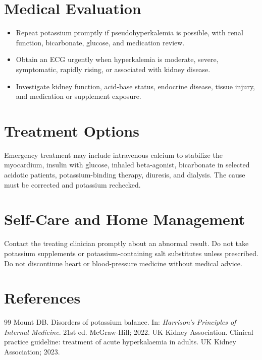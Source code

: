 \section*{Medical Evaluation}
\begin{itemize}
  \item Repeat potassium promptly if pseudohyperkalemia is possible, with renal function, bicarbonate, glucose, and medication review.
  \item Obtain an ECG urgently when hyperkalemia is moderate, severe, symptomatic, rapidly rising, or associated with kidney disease.
  \item Investigate kidney function, acid-base status, endocrine disease, tissue injury, and medication or supplement exposure.
\end{itemize}

\section*{Treatment Options}
Emergency treatment may include intravenous calcium to stabilize the myocardium, insulin with glucose, inhaled beta-agonist, bicarbonate in selected acidotic patients, potassium-binding therapy, diuresis, and dialysis. The cause must be corrected and potassium rechecked.

\section*{Self-Care and Home Management}
Contact the treating clinician promptly about an abnormal result. Do not take potassium supplements or potassium-containing salt substitutes unless prescribed. Do not discontinue heart or blood-pressure medicine without medical advice.

\section*{References}
\begin{thebibliography}{99}
 Mount DB. Disorders of potassium balance. In: \textit{Harrison's Principles of Internal Medicine}. 21st ed. McGraw-Hill; 2022.
 UK Kidney Association. Clinical practice guideline: treatment of acute hyperkalaemia in adults. UK Kidney Association; 2023.
\end{thebibliography}

